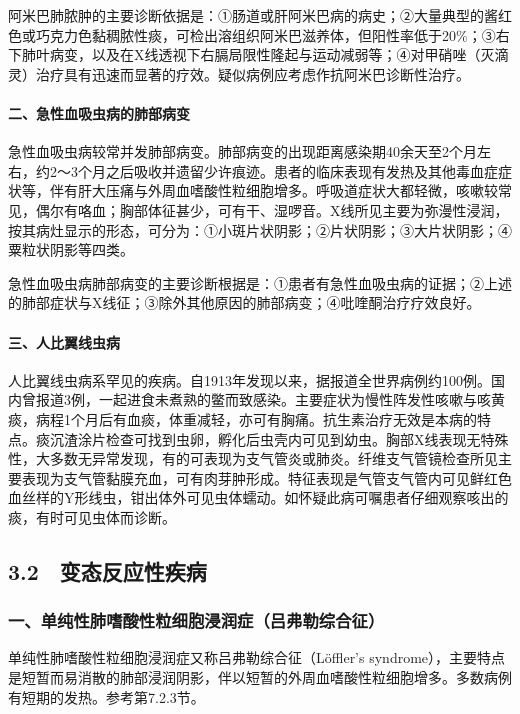 阿米巴肺脓肿的主要诊断依据是：①肠道或肝阿米巴病的病史；②大量典型的酱红色或巧克力色黏稠脓性痰，可检出溶组织阿米巴滋养体，但阳性率低于20\%；③右下肺叶病变，以及在X线透视下右膈局限性隆起与运动减弱等；④对甲硝唑（灭滴灵）治疗具有迅速而显著的疗效。疑似病例应考虑作抗阿米巴诊断性治疗。

\paragraph{二、急性血吸虫病的肺部病变}

急性血吸虫病较常并发肺部病变。肺部病变的出现距离感染期40余天至2个月左右，约2～3个月之后吸收并遗留少许痕迹。患者的临床表现有发热及其他毒血症症状等，伴有肝大压痛与外周血嗜酸性粒细胞增多。呼吸道症状大都轻微，咳嗽较常见，偶尔有咯血；胸部体征甚少，可有干、湿啰音。X线所见主要为弥漫性浸润，按其病灶显示的形态，可分为：①小斑片状阴影；②片状阴影；③大片状阴影；④粟粒状阴影等四类。

急性血吸虫病肺部病变的主要诊断根据是：①患者有急性血吸虫病的证据；②上述的肺部症状与X线征；③除外其他原因的肺部病变；④吡喹酮治疗疗效良好。

\paragraph{三、人比翼线虫病}

人比翼线虫病系罕见的疾病。自1913年发现以来，据报道全世界病例约100例。国内曾报道3例，一起进食未煮熟的鳖而致感染。主要症状为慢性阵发性咳嗽与咳黄痰，病程1个月后有血痰，体重减轻，亦可有胸痛。抗生素治疗无效是本病的特点。痰沉渣涂片检查可找到虫卵，孵化后虫壳内可见到幼虫。胸部X线表现无特殊性，大多数无异常发现，有的可表现为支气管炎或肺炎。纤维支气管镜检查所见主要表现为支气管黏膜充血，可有肉芽肿形成。特征表现是气管支气管内可见鲜红色血丝样的Y形线虫，钳出体外可见虫体蠕动。如怀疑此病可嘱患者仔细观察咳出的痰，有时可见虫体而诊断。

\protect\hypertarget{text00026.html}{}{}

\subsection{3.2　变态反应性疾病}

\subsubsection{一、单纯性肺嗜酸性粒细胞浸润症（吕弗勒综合征）}

单纯性肺嗜酸性粒细胞浸润症又称吕弗勒综合征（Löffler's
syndrome），主要特点是短暂而易消散的肺部浸润阴影，伴以短暂的外周血嗜酸性粒细胞增多。多数病例有短期的发热。参考第7.2.3节。

